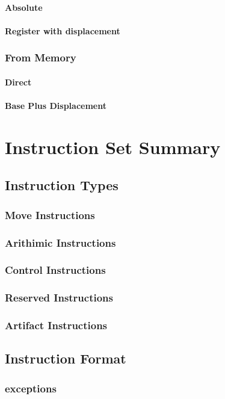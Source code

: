 \documentclass[oneside, a4paper]{memoir}
\begin{document}
\subsubsection{Absolute}
\subsubsection{Register with displacement}
\subsection{From Memory}
\subsubsection{Direct}
\subsubsection{Base Plus Displacement}

\chapter{Instruction Set Summary}
\section{Instruction Types}
\subsection{Move Instructions}
\subsection{Arithimic Instructions}
\subsection{Control Instructions}
\subsection{Reserved Instructions}
\subsection{Artifact Instructions}
\section{Instruction Format}
\subsection{exceptions}
\end{document}

